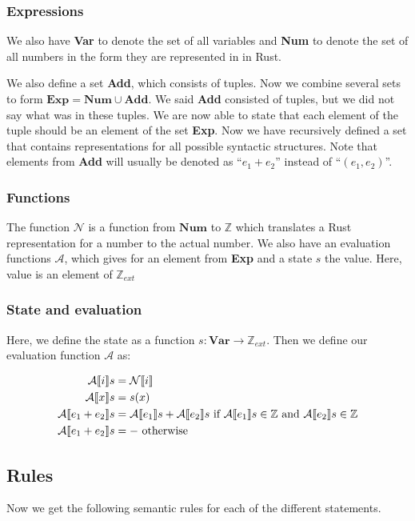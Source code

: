 \subsubsection{Expressions}
We also have \textbf{Var} to denote the set of all variables and \textbf{Num} to denote the set of all numbers in the form they are represented in in Rust.

We also define a set \textbf{Add}, which consists of tuples. Now we combine several sets to form $\textbf{Exp} = \textbf{Num} \cup \textbf{Add}$. We said \textbf{Add} consisted of tuples, but we did not say what was in these tuples. We are now able to state that each element of the tuple should be an element of the set \textbf{Exp}. Now we have recursively defined a set that contains representations for all possible syntactic structures. Note that elements from \textbf{Add} will usually be denoted as ``$e_1 + e_2$'' instead of ``$(e_1, e_2)$''.

\subsubsection{Functions}
The function $\mathcal{N}$ is a function from $\textbf{Num}$ to $\mathbb{Z}$ which translates a Rust representation for a number to the actual number. We also have an evaluation functions $\mathcal{A}$, which gives for an element from \textbf{Exp} and a state $s$ the value. Here, value is an element of $\mathbb{Z}_{ext}$

\subsubsection{State and evaluation}
Here, we define the state as a function $s: \textbf{Var} \to \mathbb{Z}_{ext}$. Then we define our evaluation function $\mathcal{A}$ as:

\begin{align*}
    \mathcal{A} \llbracket i \rrbracket s          &= \mathcal{N} \llbracket i \rrbracket
\\  \mathcal{A} \llbracket x \rrbracket s          &= s(x)
\\  \mathcal{A} \llbracket e_1 + e_2 \rrbracket s  &= \mathcal{A} \llbracket e_1 \rrbracket s + \mathcal{A} \llbracket e_2 \rrbracket s \textrm{ if } \mathcal{A} \llbracket e_1 \rrbracket s \in \mathbb{Z} \textrm{ and } \mathcal{A} \llbracket e_2 \rrbracket s \in \mathbb{Z}
\\  \mathcal{A} \llbracket e_1 + e_2 \rrbracket s  &= - \textrm{ otherwise}
\end{align*}

\subsection{Rules}
Now we get the following semantic rules for each of the different statements. 

